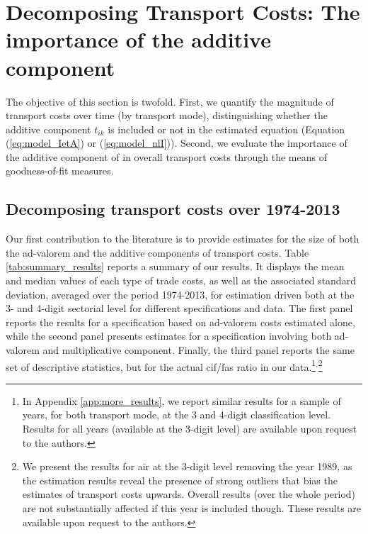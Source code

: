 \documentclass[a4paper,11pt]{article}
\begin{document}


\section{Decomposing Transport Costs: The importance of the additive component \label{sec:results_decomposition}}

The objective of this section is twofold. First, we quantify the magnitude of transport costs over time (by transport mode), distinguishing whether the additive component $t_{ik}$ is included or not in the estimated equation (Equation (\ref{eq:model_IetA}) or (\ref{eq:model_nlI})). Second, we evaluate the importance of the additive component of in overall transport costs through the means of goodness-of-fit measures.


\subsection{Decomposing transport costs over 1974-2013}

Our first contribution to the literature is to provide estimates for the size of both the ad-valorem and the additive components of transport costs. Table \ref{tab:summary_results} reports a summary of our results. It displays the mean and median values of each type of trade costs, as well as the associated standard deviation, averaged over the period 1974-2013, for estimation driven both at the 3- and 4-digit sectorial level for different specifications and data. The first panel reports the results for a specification based on ad-valorem costs estimated alone, while the second panel presents estimates for a specification involving both ad-valorem and multiplicative component. Finally, the third panel reports the same set of descriptive statistics, but for the actual cif/fas ratio in our data.\footnote{In Appendix \ref{app:more_results}, we report similar results for a sample of years, for both transport mode, at the 3 and 4-digit classification level. Results for all years (available at the 3-digit level) are available upon request to the authors.}$^{,}$\footnote{We present the results for air at the 3-digit level removing the year 1989, as the estimation results reveal the presence of strong outliers that bias the estimates of transport costs upwards. Overall results (over the whole period) are not substantially affected if this year is included though. These results are available upon request to the authors.}
\end{document}
